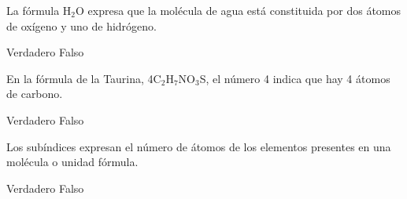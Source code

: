 \begin{multicols}{2}
\begin{parts}



        La fórmula H$_2$O expresa que la molécula de agua está constituida por dos átomos
        de oxígeno y uno de hidrógeno.

        \begin{oneparcheckboxes}
            \choice Verdadero
            \CorrectChoice Falso
        \end{oneparcheckboxes}
        En la fórmula de la Taurina, 4C$_{2}$H$_{7}$NO$_3$S, el número 4 indica que hay 4 átomos de carbono.

        \begin{oneparcheckboxes}
            \CorrectChoice Verdadero
            \choice Falso
        \end{oneparcheckboxes}






        Los subíndices expresan el número de átomos de los elementos presentes en
        una molécula o unidad fórmula.

        \begin{oneparcheckboxes}
            \CorrectChoice Verdadero
            \choice Falso
        \end{oneparcheckboxes}


\end{parts}
\end{multicols}
